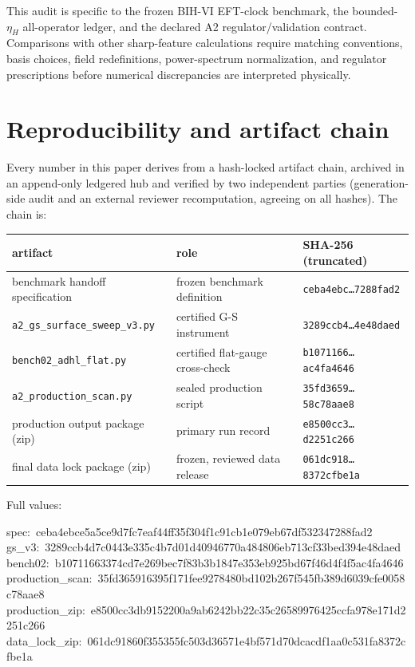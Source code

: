 \documentclass[11pt]{article}
\begin{document}
This audit is specific to the frozen BIH-VI EFT-clock benchmark, the bounded-$\eta_H$ all-operator
ledger, and the declared A2 regulator/validation contract. Comparisons with other sharp-feature
calculations require matching conventions, basis choices, field redefinitions, power-spectrum
normalization, and regulator prescriptions before numerical discrepancies are interpreted
physically.

\appendix
\section{Reproducibility and artifact chain}
\label{app:repro}
Every number in this paper derives from a hash-locked artifact chain, archived in an append-only
ledgered hub and verified by two independent parties (generation-side audit and an external
reviewer recomputation, agreeing on all hashes). The chain is:
\begin{center}
\begin{tabular}{lll}
\toprule
artifact & role & SHA-256 (truncated) \\
\midrule
benchmark handoff specification & frozen benchmark definition & \texttt{ceba4ebc\ldots7288fad2} \\
\texttt{a2\_gs\_surface\_sweep\_v3.py} & certified G-S instrument & \texttt{3289ccb4\ldots4e48daed} \\
\texttt{bench02\_adhl\_flat.py} & certified flat-gauge cross-check & \texttt{b1071166\ldots ac4fa4646} \\
\texttt{a2\_production\_scan.py} & sealed production script & \texttt{35fd3659\ldots58c78aae8} \\
production output package (zip) & primary run record & \texttt{e8500cc3\ldots d2251c266} \\
final data lock package (zip) & frozen, reviewed data release & \texttt{061dc918\ldots8372cfbe1a} \\
\bottomrule
\end{tabular}
\end{center}
Full values:
\begin{flushleft}\footnotesize\ttfamily
spec:\ ceba4ebce5a5ce9d7fc7eaf44ff35f304f1c91cb1e079eb67df532347288fad2\\
gs\_v3:\ 3289ccb4d7c0443e335c4b7d01d40946770a484806eb713cf33bed394e48daed\\
bench02:\ b10711663374cd7e269bec7f83b3b1847e353eb925bd67f46d4f4f5ac4fa4646\\
production\_scan:\ 35fd365916395f171fee9278480bd102b267f545fb389d6039cfe0058c78aae8\\
production\_zip:\ e8500cc3db9152200a9ab6242bb22c35c26589976425ccfa978e171d2251c266\\
data\_lock\_zip:\ 061dc91860f355355fc503d36571e4bf571d70dcacdf1aa0c531fa8372cfbe1a
\end{flushleft}
\end{document}
